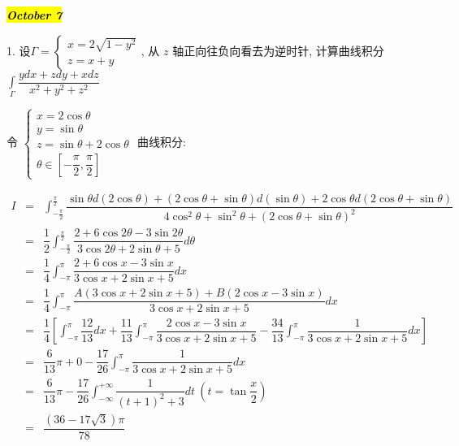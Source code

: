 \hl{\textbf{\textit{October 7}}}

1. 设$\varGamma = 
\begin{cases}
	x = 2\sqrt{1-y^2}\\
	z = x+y
\end{cases}$, 从 $z$ 轴正向往负向看去为逆时针, 计算曲线积分 
$\displaystyle{\int\limits_{\varGamma}\dfrac{ydx+zdy+xdz}{x^2+y^2+z^2}}$
\begin{solution}

	令 $\begin{cases}
		x = 2\cos \theta\\
		y = \sin \theta\\
		z = \sin \theta + 2\cos \theta\\
		\theta \in [-\dfrac{\pi}{2},\dfrac{\pi}{2}]
	\end{cases}$ 曲线积分:

	\begin{eqnarray*}
		I & = & \int_{-\frac{\pi}{2}}^{\frac{\pi}{2}}\dfrac{\sin\theta d(2\cos\theta) + (2\cos\theta+\sin\theta) d(\sin\theta) + 2\cos\theta d(2\cos\theta+\sin\theta)}{4\cos^{2}\theta+\sin^{2}\theta+(2\cos\theta + \sin\theta)^{2}}\\
		  & = & \dfrac{1}{2}\int_{-\frac{\pi}{2}}^{\frac{\pi}{2}}\dfrac{2+6\cos 2\theta-3\sin 2\theta}{3\cos 2\theta+2\sin\theta+5}d\theta\\
		  & = & \dfrac{1}{4}\int_{-\pi}^{\pi}\dfrac{2+6\cos x-3\sin x}{3\cos x+2\sin x+5}dx\\
		  & = & \dfrac{1}{4}\int_{-\pi}^{\pi}\dfrac{A(3\cos x +2\sin x+5)+B(2\cos x-3\sin x)}{3\cos x+2\sin x+5}dx\\
		  & = & \dfrac{1}{4}\left[ \int_{-\pi}^{\pi}\dfrac{12}{13}dx+\dfrac{11}{13}\int_{-\pi}^{\pi}\dfrac{2\cos x-3\sin x}{3\cos x+2\sin x+5}-\dfrac{34}{13}\int_{-\pi}^{\pi}\dfrac{1}{3\cos x+2\sin x+5}dx\right]\\
		  & = & \dfrac{6}{13}\pi+0-\dfrac{17}{26}\int_{-\pi}^{\pi}\dfrac{1}{3\cos x+2\sin x+5}dx\\
		  & = & \dfrac{6}{13}\pi - \dfrac{17}{26}\int_{-\infty}^{+\infty} \dfrac{1}{(t+1)^{2}+3}dt\ (t=\tan\dfrac{x}{2})\\
		  & = & \dfrac{(36-17\sqrt{3})\pi}{78}
	\end{eqnarray*}
\end{solution}

